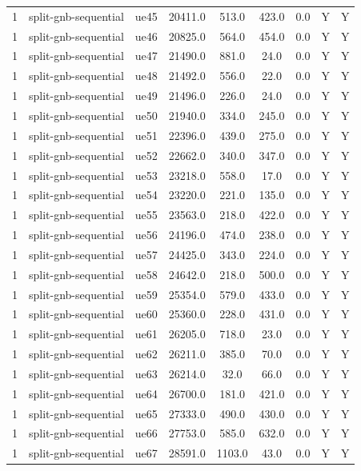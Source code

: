 \begin{table}[ht]
\begin{tabular}{|c|c|c|c|c|c|c|c|c|}
1 & split-gnb-sequential & ue45 & 20411.0 & 513.0 & 423.0 & 0.0 & Y & Y \\
1 & split-gnb-sequential & ue46 & 20825.0 & 564.0 & 454.0 & 0.0 & Y & Y \\
1 & split-gnb-sequential & ue47 & 21490.0 & 881.0 & 24.0 & 0.0 & Y & Y \\
1 & split-gnb-sequential & ue48 & 21492.0 & 556.0 & 22.0 & 0.0 & Y & Y \\
1 & split-gnb-sequential & ue49 & 21496.0 & 226.0 & 24.0 & 0.0 & Y & Y \\
1 & split-gnb-sequential & ue50 & 21940.0 & 334.0 & 245.0 & 0.0 & Y & Y \\
1 & split-gnb-sequential & ue51 & 22396.0 & 439.0 & 275.0 & 0.0 & Y & Y \\
1 & split-gnb-sequential & ue52 & 22662.0 & 340.0 & 347.0 & 0.0 & Y & Y \\
1 & split-gnb-sequential & ue53 & 23218.0 & 558.0 & 17.0 & 0.0 & Y & Y \\
1 & split-gnb-sequential & ue54 & 23220.0 & 221.0 & 135.0 & 0.0 & Y & Y \\
1 & split-gnb-sequential & ue55 & 23563.0 & 218.0 & 422.0 & 0.0 & Y & Y \\
1 & split-gnb-sequential & ue56 & 24196.0 & 474.0 & 238.0 & 0.0 & Y & Y \\
1 & split-gnb-sequential & ue57 & 24425.0 & 343.0 & 224.0 & 0.0 & Y & Y \\
1 & split-gnb-sequential & ue58 & 24642.0 & 218.0 & 500.0 & 0.0 & Y & Y \\
1 & split-gnb-sequential & ue59 & 25354.0 & 579.0 & 433.0 & 0.0 & Y & Y \\
1 & split-gnb-sequential & ue60 & 25360.0 & 228.0 & 431.0 & 0.0 & Y & Y \\
1 & split-gnb-sequential & ue61 & 26205.0 & 718.0 & 23.0 & 0.0 & Y & Y \\
1 & split-gnb-sequential & ue62 & 26211.0 & 385.0 & 70.0 & 0.0 & Y & Y \\
1 & split-gnb-sequential & ue63 & 26214.0 & 32.0 & 66.0 & 0.0 & Y & Y \\
1 & split-gnb-sequential & ue64 & 26700.0 & 181.0 & 421.0 & 0.0 & Y & Y \\
1 & split-gnb-sequential & ue65 & 27333.0 & 490.0 & 430.0 & 0.0 & Y & Y \\
1 & split-gnb-sequential & ue66 & 27753.0 & 585.0 & 632.0 & 0.0 & Y & Y \\
1 & split-gnb-sequential & ue67 & 28591.0 & 1103.0 & 43.0 & 0.0 & Y & Y \\

\end{tabular}
\end{table}
